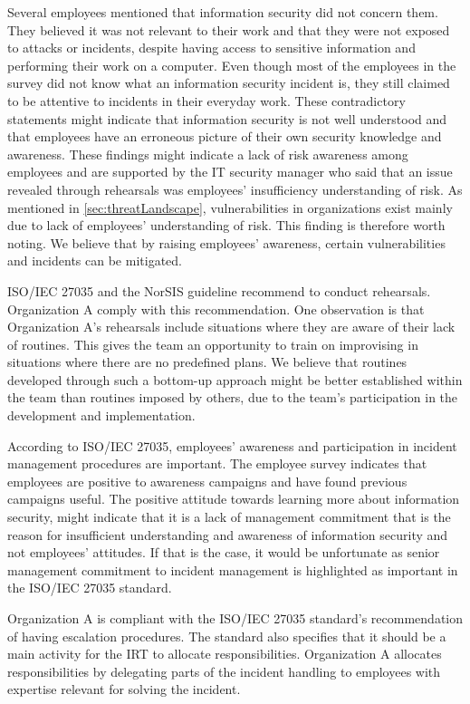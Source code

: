 Several employees mentioned that information security did not concern them. They believed it was not relevant to their work and that they were not exposed to attacks or incidents, despite having access to sensitive information and performing their work on a computer. Even though most of the employees in the survey did not know what an information security incident is, they still claimed to be attentive to incidents in their everyday work. These contradictory statements might indicate that information security is not well understood and that employees have an erroneous picture of their own security knowledge and awareness. These findings might indicate a lack of risk awareness among employees and are supported by the IT security manager who said that an issue revealed through rehearsals was employees' insufficiency understanding of risk. As mentioned in \ref{sec:threatLandscape}, vulnerabilities in organizations exist mainly due to lack of employees' understanding of risk. This finding is therefore worth noting. We believe that by raising employees' awareness, certain vulnerabilities and incidents can be mitigated.

ISO/IEC 27035 and the NorSIS guideline recommend to conduct rehearsals. Organization A comply with this recommendation. One observation is that Organization A's rehearsals include situations where they are aware of their lack of routines. This gives the team an opportunity to train on improvising in situations where there are no predefined plans. We believe that routines developed through such a bottom-up approach might be better established within the team than routines imposed by others, due to the team's participation in the development and implementation.

According to ISO/IEC 27035, employees' awareness and participation in incident management procedures are important. The employee survey indicates that employees are positive to awareness campaigns and have found previous campaigns useful. The positive attitude towards learning more about information security, might indicate that it is a lack of management commitment that is the reason for insufficient understanding and awareness of information security and not employees' attitudes. If that is the case, it would be unfortunate as senior management commitment to incident management is highlighted as important in the ISO/IEC 27035 standard.

Organization A is compliant with the ISO/IEC 27035 standard's recommendation of having escalation procedures. The standard also specifies that it should be a main activity for the \ac{IRT} to allocate responsibilities. Organization A allocates responsibilities by delegating parts of the incident handling to employees with expertise relevant for solving the incident.

